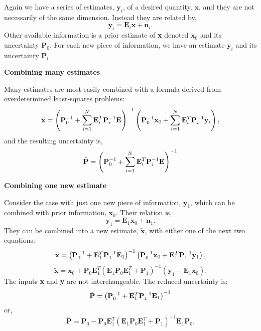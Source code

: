 \documentclass{article}
\begin{document}
Again we have a series of estimates, $\mathbf{y}_{i}$, of a desired
quantity, $\mathbf{x}$, and they are not necessarily of the same
dimension. Instead they are related by,
\begin{equation}
\label{eq:17}
\mathbf{y}_i = \mathbf{E}_i \mathbf{x} + \mathbf{n}_i.
\end{equation}
Other available information is a prior estimate of \textbf{x} denoted
$\mathbf{x}_0$ and its uncertainty $\mathbf{P}_{0}$. For each new
piece of information, we have an estimate $\mathbf{y}_i$ and its
uncertainty $\mathbf{P}_{i}$.

\textbf{{Combining many estimates}}

Many estimates are most easily combined with a formula derived from overdetermined least-squares problems:
\begin{equation}
\label{eq:18}
\tilde{\mathbf{x}} = \left({\bf P}^{-1}_0 + \sum_{i=1}^{N} {\bf E}^T_i {\bf P}_i^{-1} {\bf E} \right)^{-1} \left( {\bf P}_0^{-1} {\bf x}_{0} +  \sum_{i=1}^{N} {\bf E}^T_i {\bf P}_i^{-1} {\bf y}_{i} \right),
\end{equation}
and the resulting uncertainty is,
\begin{equation}
  \label{eq:19}
 \tilde{\mathbf{P}}= \left({\bf P}^{-1}_0 + \sum_{i=1}^{N} {\bf E}^T_i {\bf P}_i^{-1} {\bf E} \right)^{-1}
\end{equation}

\textbf{{Combining one new estimate}}

Consider the case with just one new piece of information,
$\mathbf{y}_{1}$, which can be combined with prior information,
$\mathbf{x}_{0}$. Their relation is,
\begin{equation}
\mathbf{y}_1 = \mathbf{E}_1 \mathbf{x}_{0} + \mathbf{n}_1.
\end{equation}
They can be combined into a new estimate,
$\tilde{\mathbf{x}}$, with either one of the next two equations:
\begin{equation}
\tilde{\mathbf{x}} = \left({\bf P}^{-1}_0 + {\bf E}^T_1 {\bf P}_1^{-1} {\bf E}_1 \right)^{-1} \left( {\bf P}_0^{-1} {\bf x}_{0} +  {\bf E}^T_1 {\bf P}_1^{-1} {\bf y}_1 \right),
\end{equation}
\begin{equation}
\label{eq:15}
\tilde{\mathbf{x}} = \mathbf{x}_0 + \mathbf{P}_0 \mathbf{E}^T_1 (\mathbf{E}_1 \mathbf{P}_0 \mathbf{E}^T_1 + \mathbf{P}_1 )^{-1} (\mathbf{y}_1 - \mathbf{E}_1 \mathbf{x}_0) .
\end{equation}
The inputs \textbf{x} and \textbf{y} are not interchangeable. The reduced uncertainty is:
\begin{equation}
 \tilde{\mathbf{P}}= \left({\bf P}^{-1}_0 + {\bf E}^T_1 {\bf P}_1^{-1} {\bf E}_1 \right)^{-1}
\end{equation}
or,
\begin{equation}
\label{eq:16}
\tilde{\mathbf{P}} = \mathbf{P}_0 - \mathbf{P}_0 \mathbf{E}^T_1 (\mathbf{E}_1 \mathbf{P}_0 \mathbf{E}^T_1 + \mathbf{P}_1 )^{-1} \mathbf{E}_1 \mathbf{P}_0.
\end{equation}
\end{document}
